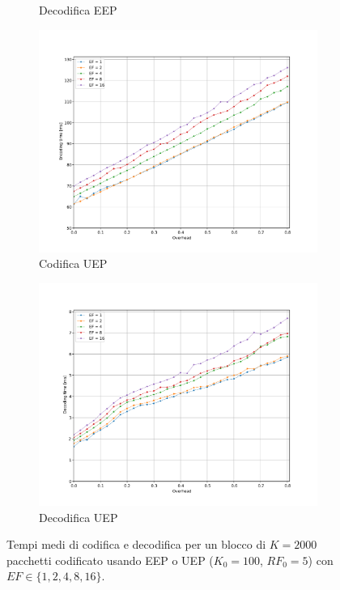 \documentclass[italian, a4paper, 12pt]{article}
\begin{document}
\begin{figure}[htb]
\begin{subfigure}{0.5\textwidth}
    \caption{Decodifica EEP}
    \label{fig:dectime_eep}
  \end{subfigure}
  \begin{subfigure}{0.5\textwidth}
    \centering
    \includegraphics[width=\textwidth]{plot_enc_time_uep}
    \caption{Codifica UEP}
    \label{fig:enctime_uep}
  \end{subfigure}%
  \begin{subfigure}{0.5\textwidth}
    \centering
    \includegraphics[width=\textwidth]{plot_dec_time_uep}
    \caption{Decodifica UEP}
    \label{fig:dectime_uep}
  \end{subfigure}
  \caption{Tempi medi di codifica e decodifica per un blocco di
    $K=2000$ pacchetti codificato usando EEP o UEP ($K_0 = 100$,
    $RF_0=5$) con $EF \in \{1,2,4,8,16\}$.}
  \label{fig:encdec}
\end{figure}
\end{document}
